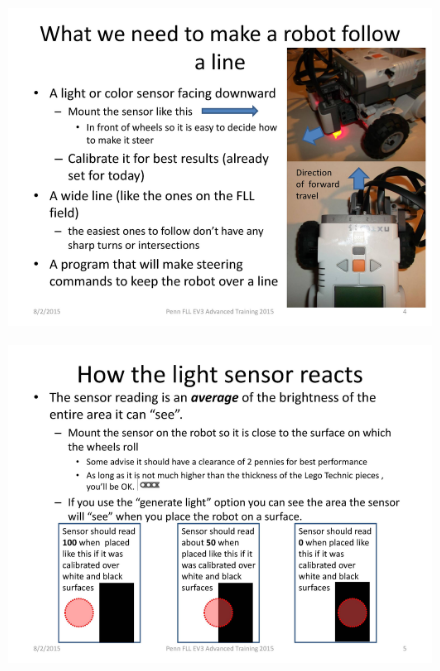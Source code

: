 \documentclass[11pt]{beamer}
\begin{document}
\begin{frame}
\begin{figure}
\includegraphics[scale=0.4]{ev3advanced2015/file-page4}
\end{figure}
\end{frame}

\begin{frame}
\begin{figure}
\includegraphics[scale=0.4]{ev3advanced2015/file-page5}
\end{figure}
\end{frame}
\end{document}

